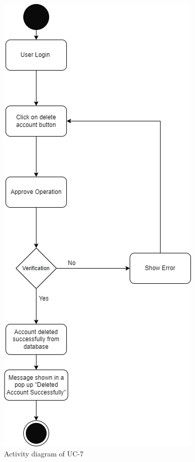 \begin{figure}[H]
    \centering
    \includegraphics[scale=0.5]{./diagrams/Activity Diagram/ad-07.png}
    \caption{Activity diagram of UC-7}
    \label{fig:act-07}

\end{figure}


